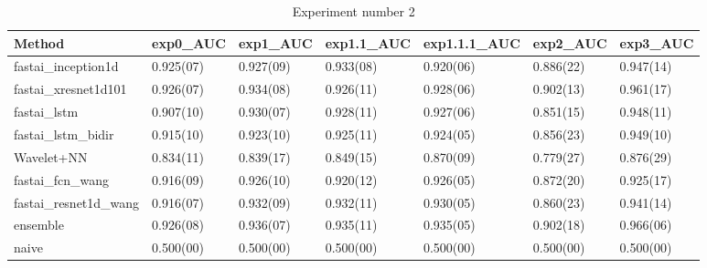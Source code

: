 \begin{table}[hp]
\scriptsize
\caption{Experiment number 2}
\begin{tabular}{lllllll}
\cellcolor[HTML]{C0C0C0}\textbf{Method} & \cellcolor[HTML]{C0C0C0}\textbf{exp0\_AUC} & \cellcolor[HTML]{C0C0C0}\textbf{exp1\_AUC} & \cellcolor[HTML]{C0C0C0}\textbf{exp1.1\_AUC} & \cellcolor[HTML]{C0C0C0}\textbf{exp1.1.1\_AUC} & \cellcolor[HTML]{C0C0C0}\textbf{exp2\_AUC} & \cellcolor[HTML]{C0C0C0}\textbf{exp3\_AUC} \\\hline
fastai\_inception1d         & 0.925(07) & 0.927(09) & 0.933(08) & 0.920(06) & 0.886(22) & 0.947(14) \\
fastai\_xresnet1d101        & 0.926(07) & 0.934(08) & 0.926(11) & 0.928(06) & 0.902(13) & 0.961(17) \\
fastai\_lstm                & 0.907(10) & 0.930(07) & 0.928(11) & 0.927(06) & 0.851(15) & 0.948(11) \\
fastai\_lstm\_bidir         & 0.915(10) & 0.923(10) & 0.925(11) & 0.924(05) & 0.856(23) & 0.949(10) \\
Wavelet+NN                  & 0.834(11) & 0.839(17) & 0.849(15) & 0.870(09) & 0.779(27) & 0.876(29) \\
fastai\_fcn\_wang           & 0.916(09) & 0.926(10) & 0.920(12) & 0.926(05) & 0.872(20) & 0.925(17) \\
fastai\_resnet1d\_wang      & 0.916(07) & 0.932(09) & 0.932(11) & 0.930(05) & 0.860(23) & 0.941(14) \\
ensemble                    & 0.926(08) & 0.936(07) & 0.935(11) & 0.935(05) & 0.902(18) & 0.966(06) \\
naive                       & 0.500(00) & 0.500(00) & 0.500(00) & 0.500(00) & 0.500(00) & 0.500(00)      \\\hline                           
\end{tabular}
\end{table}





